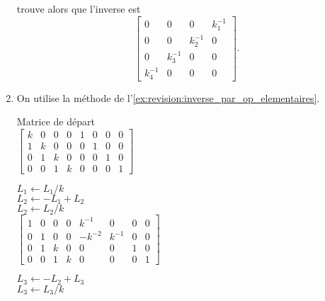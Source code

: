 \begin{exercice}
\begin{sol}
\begin{enumerate}
      trouve alors que l'inverse est
      \begin{displaymath}
        \begin{bmatrix}
          0 & 0 & 0 & k_1^{-1} \\
          0 & 0 & k_2^{-1} & 0 \\
          0 & k_3^{-1} & 0 & 0 \\
          k_4^{-1} & 0 & 0 & 0
        \end{bmatrix}.
      \end{displaymath}
    \item On utilise la méthode de l'\autoref{ex:revision:inverse_par_op_elementaires}.
      \setlength{\ocolumnsep}{\columnsep}
      \setlength{\columnsep}{-86pt}
      \begin{multicols}{2}
        Matrice de départ \\
        \columnbreak
        $%
        \left[
          \begin{array}{rrrr|rrrr}
            k & 0 & 0 & 0 & 1 & 0 & 0 & 0 \\
            1 & k & 0 & 0 & 0 & 1 & 0 & 0 \\
            0 & 1 & k & 0 & 0 & 0 & 1 & 0 \\
            0 & 0 & 1 & k & 0 & 0 & 0 & 1
          \end{array}
        \right]
        $
      \end{multicols}
      \begin{multicols}{2}
        $L_1 \leftarrow L_1/k$ \\
        $L_2 \leftarrow - L_1 + L_2$ \\
        $L_2 \leftarrow L_2/k$ \\
        \columnbreak
        $%
        \left[
          \begin{array}{rrrr|rrrr}
            1 & 0 & 0 & 0 &  k^{-1} &     0 & 0 & 0 \\
            0 & 1 & 0 & 0 & -k^{-2} & k^{-1} & 0 & 0 \\
            0 & 1 & k & 0 &       0 &     0 & 1 & 0 \\
            0 & 0 & 1 & k &       0 &     0 & 0 & 1
          \end{array}
        \right]
        $
      \end{multicols}
      \begin{multicols}{2}
        $L_3 \leftarrow - L_2 + L_3$ \\
        $L_3 \leftarrow L_3/k$ \\
        \columnbreak

\end{multicols}
\end{enumerate}
\end{sol}
\end{exercice}
